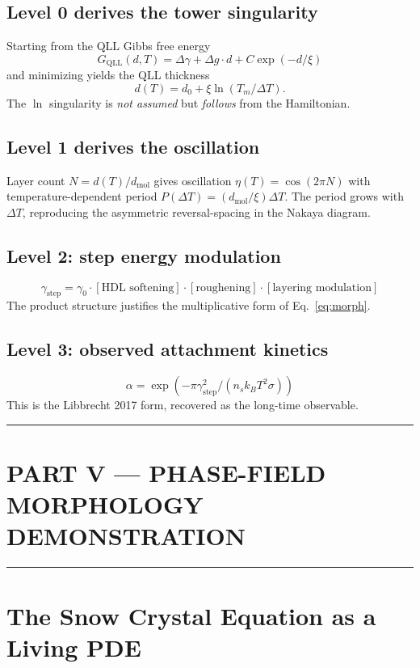 \documentclass[11pt,a4paper]{article}
\begin{document}
\subsection{Level 0 derives the tower singularity}
Starting from the QLL Gibbs free energy
\[
G_\text{QLL}(d, T) = \Delta\gamma + \Delta g \cdot d + C \exp(-d/\xi)
\]
and minimizing yields the QLL thickness
\[
d(T) = d_0 + \xi \ln(T_m/\Delta T).
\]
The $\ln$ singularity is \emph{not assumed} but \emph{follows} from the Hamiltonian.

\subsection{Level 1 derives the oscillation}
Layer count $N = d(T)/d_\text{mol}$ gives oscillation $\eta(T) = \cos(2\pi N)$ with temperature-dependent period $P(\Delta T) = (d_\text{mol}/\xi) \Delta T$. The period grows with $\Delta T$, reproducing the asymmetric reversal-spacing in the Nakaya diagram.

\subsection{Level 2: step energy modulation}
\[
\gamma_\text{step} = \gamma_0 \cdot [\text{HDL softening}] \cdot [\text{roughening}] \cdot [\text{layering modulation}]
\]
The product structure justifies the multiplicative form of Eq.~\ref{eq:morph}.

\subsection{Level 3: observed attachment kinetics}
\[
\alpha = \exp(-\pi \gamma_\text{step}^2 / (n_s k_B T^2 \sigma))
\]
This is the Libbrecht 2017 form, recovered as the long-time observable.

\hrule\vspace{14pt}

\section*{\centering PART V — PHASE-FIELD MORPHOLOGY DEMONSTRATION}
\hrule\vspace{12pt}

\section{The Snow Crystal Equation as a Living PDE}
\label{sec:phasefield}
\end{document}
